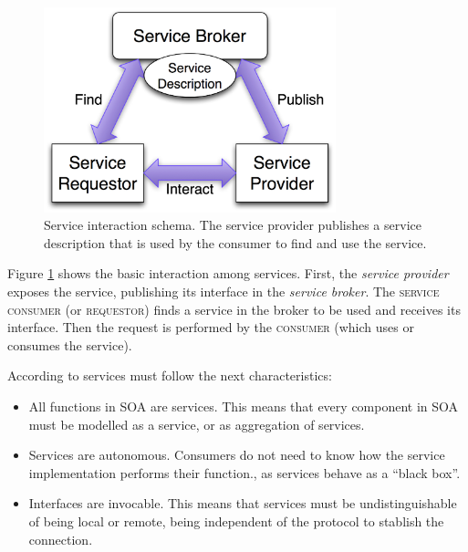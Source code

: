 \begin{figure}
\centering
\includegraphics[width=20pc]{gfx/soa/soaDiagram.jpg}
\caption{Service interaction schema. The service provider publishes a service description that is used by the consumer to find and use the service.}
\label{fig:soadiagram}
\end{figure}




Figure \ref{fig:soadiagram} shows the basic interaction among
services. First, the {\em service provider} exposes the service, publishing
its interface in the {\em service broker}. The \textsc{service consumer} (or
\textsc{requestor}) finds  a service in the broker to be used and receives its
interface. Then the request is performed by the \textsc{consumer} (which uses or
consumes the service).  

According to  \cite{Channabasavaiah2003migrating} services must follow the next characteristics:

\begin{itemize}
\item All functions in SOA are services. This means that every component in SOA must be modelled as a service, or as aggregation of services. 
\item Services are autonomous. Consumers do not need to know how the service implementation performs their function., as services behave as a ``black box''.
\item Interfaces are invocable. This means that services must be undistinguishable of being local or remote, being independent of the protocol to stablish the connection.
\end{itemize}

